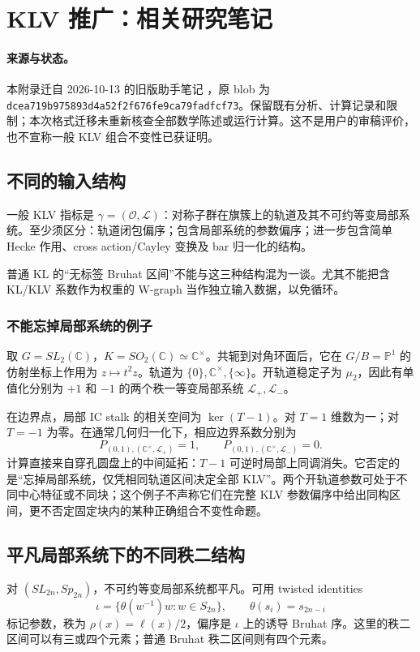 \section{KLV 推广：相关研究笔记}\label{app:klv}
\paragraph{来源与状态。}
本附录迁自 2026-10-13 的旧版助手笔记 ，原 blob 为 \nolinkurl{dcea719b975893d4a52f2f676fe9ca79fadfcf73}。保留既有分析、计算记录和限制；本次格式迁移未重新核查全部数学陈述或运行计算。这不是用户的审稿评价，也不宣称一般 KLV 组合不变性已获证明。

\subsection{不同的输入结构}
一般 KLV 指标是 \(\gamma=(\mathcal O,\mathcal L)\)：对称子群在旗簇上的轨道及其不可约等变局部系统。至少须区分：轨道闭包偏序；包含局部系统的参数偏序；进一步包含简单 Hecke 作用、cross action/Cayley 变换及 bar 归一化的结构。

普通 KL 的“无标签 Bruhat 区间”不能与这三种结构混为一谈。尤其不能把含 KL/KLV 系数作为权重的 W-graph 当作独立输入数据，以免循环。

\subsubsection{不能忘掉局部系统的例子}
取 \(G=SL_2(\mathbb C)\)，\(K=SO_2(\mathbb C)\simeq\mathbb C^\times\)。共轭到对角环面后，它在 \(G/B=\mathbb P^1\) 的仿射坐标上作用为 \(z\mapsto t^2z\)。轨道为 \(\{0\},\mathbb C^\times,\{\infty\}\)。开轨道稳定子为 \(\mu_2\)，因此有单值化分别为 \(+1\) 和 \(-1\) 的两个秩一等变局部系统 \(\mathcal L_+,\mathcal L_-\)。

在边界点，局部 IC stalk 的相关空间为 \(\ker(T-1)\)。对 \(T=1\) 维数为一；对 \(T=-1\) 为零。在通常几何归一化下，相应边界系数分别为
\[
P_{(0,1),(\mathbb C^\times,\mathcal L_+)}=1,\qquad
P_{(0,1),(\mathbb C^\times,\mathcal L_-)}=0.
\]
计算直接来自穿孔圆盘上的中间延拓：\(T-1\) 可逆时局部上同调消失。它否定的是“忘掉局部系统，仅凭相同轨道区间决定全部 KLV”。两个开轨道参数可处于不同中心特征或不同块；这个例子不声称它们在完整 KLV 参数偏序中给出同构区间，更不否定固定块内的某种正确组合不变性命题。

\subsection{平凡局部系统下的不同秩二结构}
对 \((SL_{2n},Sp_{2n})\)，不可约等变局部系统都平凡。可用 twisted identities
\[
\iota=\{\theta(w^{-1})w:w\in S_{2n}\},\qquad
\theta(s_i)=s_{2n-i}
\]
标记参数，秩为 \(\rho(x)=\ell(x)/2\)，偏序是 \(\iota\) 上的诱导 Bruhat 序。这里的秩二区间可以有三或四个元素；普通 Bruhat 秩二区间则有四个元素。

